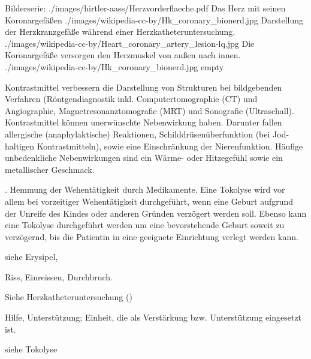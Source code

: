 \begin{description}
  \begin{PictureSeriesWide}{}{Bilderserie:
    }
    {./images/hirtler-aass/Herzvorderflaeche.pdf}
    {Das Herz mit seinen Koronargefäßen }
    {./images/wikipedia-cc-by/Hk_coronary_bionerd.jpg}
    {Darstellung der
    Herzkranzgefäße während einer Herzkatheteruntersuchung.
    }
    {./images/wikipedia-cc-by/Heart_coronary_artery_lesion-lq.jpg}
    {Die Koronargefäße versorgen den
    Herzmuskel von außen nach innen. } {./images/wikipedia-cc-by/Hk_coronary_bionerd.jpg}
    {empty}
    {}
  \end{PictureSeriesWide}
  \item[\IX{Kontrastmittel}] \label{topic:kontrasmittel}
  Kontrastmittel verbessern die Darstellung von Strukturen
  bei bildgebenden Verfahren (Röntgendiagnostik inkl.
  Computertomographie (CT) und Angiographie,
  Magnetresonanztomografie (MRT) und Sonografie (Ultraschall). Kontrastmittel können
  unerwünschte Nebenwirkung haben. Darunter fallen
  allergische (anaphylaktische) Reaktionen,
  Schilddrüsenüberfunktion (bei Jod-haltigen
  Kontrastmitteln), sowie eine Einschränkung der
  Nierenfunktion. Häufige unbedenkliche Nebenwirkungen sind
  ein Wärme- oder Hitzegefühl sowie ein metallischer
  Geschmack.
  \item[\IX{Tokolyse}]  . Hemmung
  der Wehentätigkeit durch Medikamente. Eine Tokolyse wird
  vor allem bei vorzeitiger Wehentätigkeit durchgeführt,
  wenn eine Geburt aufgrund der Unreife des Kindes oder
  anderen Gründen verzögert werden soll. Ebenso kann eine
  Tokolyse durchgeführt werden um eine bevorstehende Geburt
  soweit zu verzögernd, bis die Patientin in eine geeignete
  Einrichtung verlegt werden kann.
  \item[\IX{Rotlauf}] siehe Erysipel, 
  \item[\IX{Ruptur}] Riss, Einreissen, Durchbruch.
  \item[Stent] Siehe Herzkatheteruntersuchung
  ()
  \item[\IX{Sukkurs}] Hilfe, Unterstützung; Einheit, die
  als Verstärkung bzw. Unterstützung eingesetzt ist.
  \item[\IX{Wehenhemmung}] siehe Tokolyse
\end{description}
